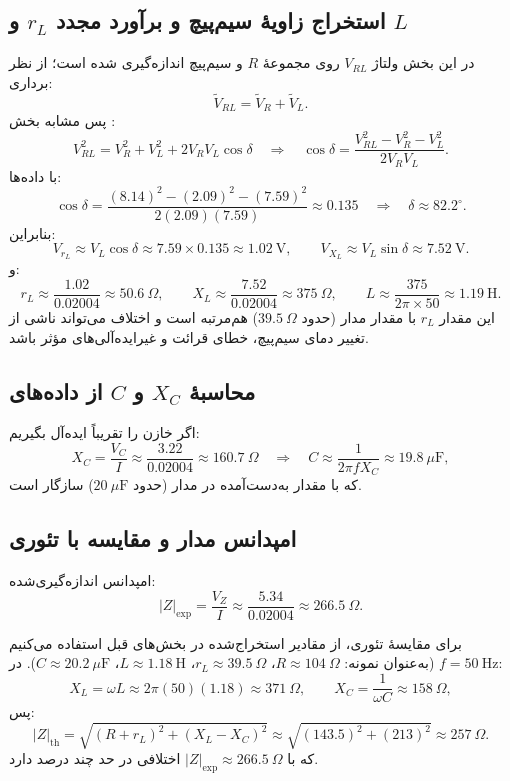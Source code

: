 \documentclass[a4paper,11pt]{article}
\newcommand{\abs}[1]{\left|#1\right|}
\begin{document}
\subsection{استخراج زاویهٔ سیم‌پیچ و برآورد مجدد $r_L$ و $L$}
در این بخش ولتاژ $V_{RL}$ روی مجموعهٔ $R$ و سیم‌پیچ اندازه‌گیری شده است؛ از نظر برداری:
\[
\tilde V_{RL}=\tilde V_R+\tilde V_L.
\]
پس مشابه بخش :
\[
V_{RL}^2=V_R^2+V_L^2+2V_RV_L\cos\delta
\quad\Rightarrow\quad
\cos\delta=\frac{V_{RL}^2-V_R^2-V_L^2}{2V_RV_L}.
\]
با داده‌ها:
\[
\cos\delta=\frac{(8.14)^2-(2.09)^2-(7.59)^2}{2(2.09)(7.59)}\approx 0.135
\quad\Rightarrow\quad
\delta\approx 82.2^\circ.
\]
بنابراین:
\[
V_{r_L}\approx V_L\cos\delta \approx 7.59\times 0.135 \approx 1.02~\mathrm{V},
\qquad
V_{X_L}\approx V_L\sin\delta \approx 7.52~\mathrm{V}.
\]
و:
\[
r_L\approx \frac{1.02}{0.02004}\approx 50.6~\Omega,
\qquad
X_L\approx \frac{7.52}{0.02004}\approx 375~\Omega,
\qquad
L\approx \frac{375}{2\pi\times 50}\approx 1.19~\mathrm{H}.
\]
این مقدار $r_L$ با مقدار مدار  (حدود $39.5~\Omega$) هم‌مرتبه است و اختلاف می‌تواند ناشی از تغییر دمای سیم‌پیچ، خطای قرائت و غیرایده‌آلی‌های مؤثر باشد.

\subsection{محاسبهٔ $X_C$ و $C$ از داده‌های }
اگر خازن را تقریباً ایده‌آل بگیریم:
\[
X_C=\frac{V_C}{I}\approx \frac{3.22}{0.02004}\approx 160.7~\Omega
\quad\Rightarrow\quad
C\approx \frac{1}{2\pi f X_C}\approx 19.8~\mu\mathrm{F},
\]
که با مقدار به‌دست‌آمده در مدار  (حدود $20~\mu\mathrm{F}$) سازگار است.

\subsection{امپدانس مدار و مقایسه با تئوری}
امپدانس اندازه‌گیری‌شده:
\[
\abs{Z}_{\text{exp}}=\frac{V_Z}{I}\approx \frac{5.34}{0.02004}\approx 266.5~\Omega.
\]

برای مقایسهٔ تئوری، از مقادیر استخراج‌شده در بخش‌های قبل استفاده می‌کنیم (به‌عنوان نمونه: $R\approx 104~\Omega$، $r_L\approx 39.5~\Omega$، $L\approx 1.18~\mathrm{H}$، $C\approx 20.2~\mu\mathrm{F}$). در $f=50~\mathrm{Hz}$:
\[
X_L=\omega L\approx 2\pi(50)(1.18)\approx 371~\Omega,\qquad
X_C=\frac{1}{\omega C}\approx 158~\Omega,
\]
پس:
\[
\abs{Z}_{\text{th}}=\sqrt{(R+r_L)^2+(X_L-X_C)^2}
\approx \sqrt{(143.5)^2+(213)^2}\approx 257~\Omega.
\]
که با $\abs{Z}_{\text{exp}}\approx 266.5~\Omega$ اختلافی در حد چند درصد دارد.
\end{document}
